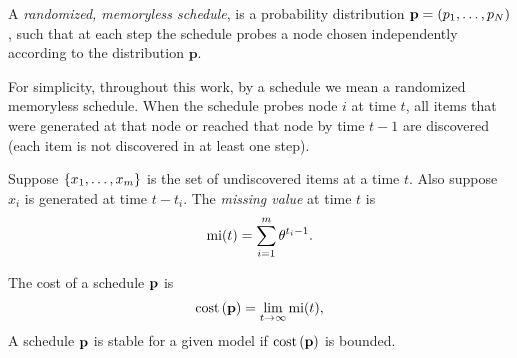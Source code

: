 %
%
%

\begin{definition}
A \emph{randomized, memoryless schedule}, is a probability distribution $\mathbf{p} = (p_1,\ldots,p_N)$,
such that at each step the schedule probes a node chosen independently according to the distribution $\mathbf{p}$.
\end{definition}
For simplicity, throughout this work, by a schedule we mean a randomized memoryless schedule.
When the schedule probes node $i$ at time $t$, all items that were generated at that node or reached that node by time $t-1$ are discovered (each item is not discovered in at least one step). 

\begin{definition}
Suppose $\left\{x_1, \ldots, x_m\right\}$ is the set of undiscovered items at a time $t$. Also suppose $x_i$ is generated at time $t-t_i$.  The \emph{missing value} at time $t$ is 
$$\text{mi}(t) = \sum_{i=1}^m \theta^{t_i-1}.$$
\end{definition}




\begin{definition}
The cost of a schedule $\mathbf{p}$ is 
\begin{align*}
\text{cost}\left( \mathbf{p} \right) = \lim_{t\rightarrow \infty} \text{mi}(t),
\end{align*}
A schedule $\mathbf{p}$ is stable for a given model if $\text{cost}\left( \mathbf{p} \right)$ is bounded.
\end{definition}





